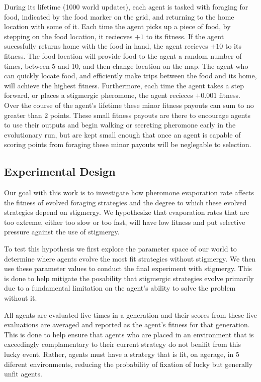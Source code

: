 During its lifetime (1000 world updates), each agent is tasked with foraging for food, indicated by the food marker on the grid, and returning to the home location with some of it. Each time the agent picks up a piece of food, by stepping on the food location, it reciecves $+1$ to its fitness. If the agent sucessfully returns home with the food in hand, the agent recieves $+10$ to its fitness. The food location will provide food to the agent a random number of times, between 5 and 10, and then change location on the map. The agent who can quickly locate food, and efficiently make trips between the food and its home, will achieve the highest fitness. Furthermore, each time the agent takes a step forward, or places a stigmergic pheromone, the agent recieces $+0.001$ fitness. Over the course of the agent's lifetime these minor fitness payouts can sum to no greater than $2$ points. These small fitness payouts are there to encourage agents to use their outputs and begin walking or secreting pheromone early in the evolutionary run, but are kept small enough that once an agent is capable of scoring points from foraging these minor payouts will be neglegable to selection.

\subsection {Experimental Design}

Our goal with this work is to investigate how pheromone evaporation rate affects the fitness of evolved foraging strategies and the degree to which these evolved strategies depend on stigmergy. We hypothesize that evaporation rates that are too extreme, either too slow or too fast, will have low fitness and put selective pressure against the use of stigmergy. 

To test this hypothesis we first explore the parameter space of our world to determine where agents evolve the most fit strategies without stigmergy. We then use these parameter values to conduct the final experiment with stigmergy. This is done to help mitigate the posability that stigmergic strategies evolve primarily due to a fundamental limitation on the agent's ability to solve the problem without it.

All agents are evaluated five times in a generation and their scores from these five evaluations are averaged and reported as the agent's fitness for that generation. This is done to help ensure that agents who are placed in an environment that is exceedingly complamentary to their current strategy do not benifit from this lucky event. Rather, agents must have a strategy that is fit, on agerage, in 5 diferent environments, reducing the probability of fixation of lucky but generally unfit agents.

